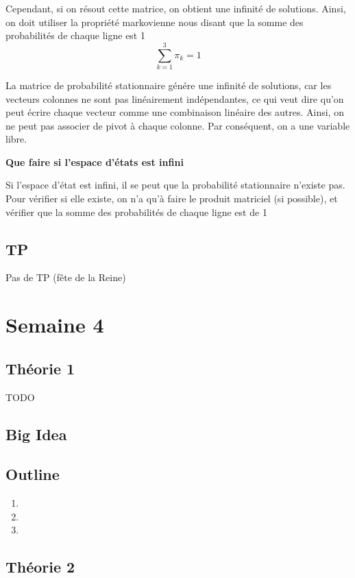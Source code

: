 \documentclass{article}
\begin{document}
Cependant, si on résout cette matrice, on obtient une infinité de solutions.
Ainsi, on doit utiliser la propriété markovienne nous disant que la somme des
probabilités de chaque ligne est 1
$$ \sum^{3}_{k=1} \pi _k = 1$$

\begin{remark}
    La matrice de probabilité stationnaire génére une infinité de solutions,
    car les vecteurs colonnes ne sont pas linéairement indépendantes, ce qui
    veut dire qu'on peut écrire chaque vecteur comme une combinaison linéaire
    des autres. Ainsi, on ne peut pas associer de pivot à chaque colonne. Par
    conséquent, on a une variable libre.
\end{remark}

\textbf{Que faire si l'espace d'états est infini}

Si l'espace d'état est infini, il se peut que la probabilité stationnaire
n'existe pas. Pour vérifier si elle existe, on n'a qu'à faire le produit
matriciel (si possible), et vérifier que la somme des probabilités de chaque
ligne est de 1

\subsection{TP}

Pas de TP (fête de la Reine)

\pagebreak
\section{Semaine 4}
\subsection{Théorie 1}
TODO
\subsection*{Big Idea}
\subsection*{Outline}
\begin{enumerate}
    \item
    \item
    \item
\end{enumerate}
\subsection{Théorie 2}
\end{document}
